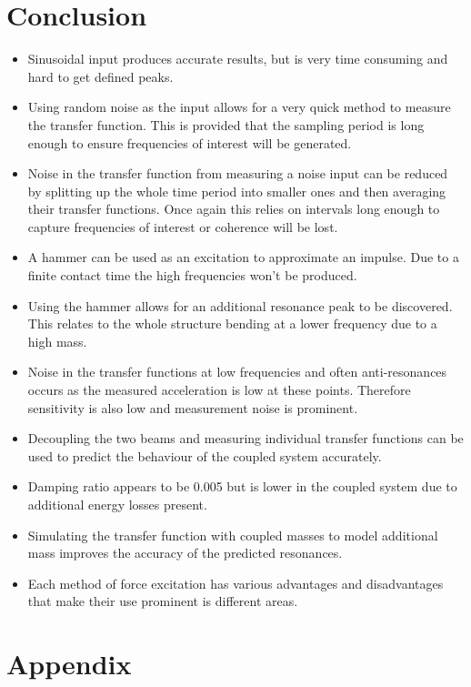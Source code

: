 \documentclass[twoside,onecolumn]{article}
\begin{document}

\section{Conclusion}
\begin{itemize}
\item Sinusoidal input produces accurate results, but is very time consuming and hard to get defined peaks.
\item Using random noise as the input allows for a very quick method to measure the transfer function. This is provided that the sampling period is long enough to ensure frequencies of interest will be generated.
\item Noise in the transfer function from measuring a noise input can be reduced by splitting up the whole time period into smaller ones and then averaging their transfer functions. Once again this relies on intervals long enough to capture frequencies of interest or coherence will be lost.
\item A hammer can be used as an excitation to approximate an impulse. Due to a finite contact time the high frequencies won't be produced. 
\item Using the hammer allows for an additional resonance peak to be discovered. This relates to the whole structure bending at a lower frequency due to a high mass.
\item Noise in the transfer functions at low frequencies and often anti-resonances occurs as the measured acceleration is low at these points. Therefore sensitivity is also low and measurement noise is prominent. 
\item Decoupling the two beams and measuring individual transfer functions can be used to predict the behaviour of the coupled system accurately. 
\item Damping ratio appears to be 0.005 but is lower in the coupled system due to additional energy losses present.
\item Simulating the transfer function with coupled masses to model additional mass improves the accuracy of the predicted resonances.
\item Each method of force excitation has various advantages and disadvantages that make their use prominent is different areas.
\end{itemize}

\section{Appendix}
\end{document}
